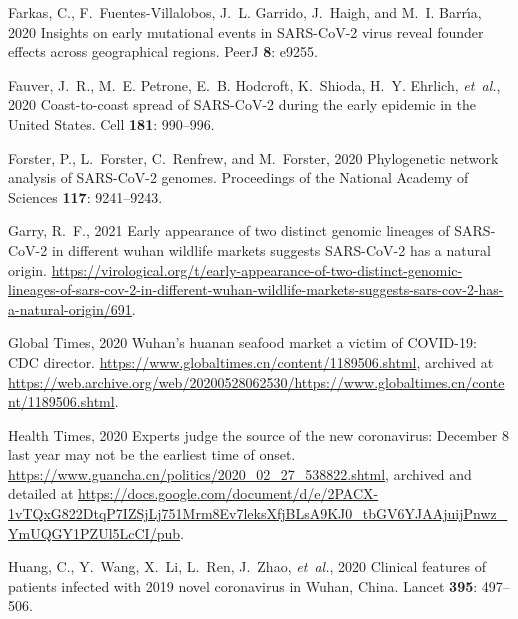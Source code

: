 \documentclass[9pt,twocolumn,twoside]{gsajnl_modified}
\begin{document}
\begin{thebibliography}{47}
{Farkas, C., F.~Fuentes-Villalobos, J.~L. Garrido, J.~Haigh, {\rm and} M.~I.
  Barr{\'\i}a}, 2020 Insights on early mutational events in {SARS-CoV-2} virus
  reveal founder effects across geographical regions. PeerJ {\bf 8}: e9255.

{Fauver, J.~R., M.~E. Petrone, E.~B. Hodcroft, K.~Shioda, H.~Y. Ehrlich, {\em
  et~al.\/}}, 2020 {Coast-to-coast spread of SARS-CoV-2 during the early
  epidemic in the United States}. Cell {\bf 181}: 990--996.

{Forster, P., L.~Forster, C.~Renfrew, {\rm and} M.~Forster}, 2020 Phylogenetic
  network analysis of {SARS-CoV-2} genomes. Proceedings of the National Academy
  of Sciences {\bf 117}: 9241--9243.

{Garry, R.~F.}, 2021 Early appearance of two distinct genomic lineages of
  {SARS-CoV-2} in different wuhan wildlife markets suggests {SARS-CoV-2} has a
  natural origin.
  \url{https://virological.org/t/early-appearance-of-two-distinct-genomic-lineages-of-sars-cov-2-in-different-wuhan-wildlife-markets-suggests-sars-cov-2-has-a-natural-origin/691}.

{{Global Times}}, 2020 Wuhan's huanan seafood market a victim of {COVID-19}:
  {CDC} director. \url{https://www.globaltimes.cn/content/1189506.shtml},
  archived at
  \url{https://web.archive.org/web/20200528062530/https://www.globaltimes.cn/content/1189506.shtml}.

{{Health Times}}, 2020 Experts judge the source of the new coronavirus:
  {December} 8 last year may not be the earliest time of onset.
  \url{https://www.guancha.cn/politics/2020_02_27_538822.shtml}, archived and
  detailed at
  \url{https://docs.google.com/document/d/e/2PACX-1vTQxG822DtqP7IZSjLj751Mrm8Ev7leksXfjBLsA9KJ0_tbGV6YJAAjuijPnwz_YmUQGY1PZUl5LcCI/pub}.

{Huang, C., Y.~Wang, X.~Li, L.~Ren, J.~Zhao, {\em et~al.\/}}, 2020 Clinical
  features of patients infected with 2019 novel coronavirus in {Wuhan, China}.
  Lancet {\bf 395}: 497--506.


\end{thebibliography}
\end{document}
